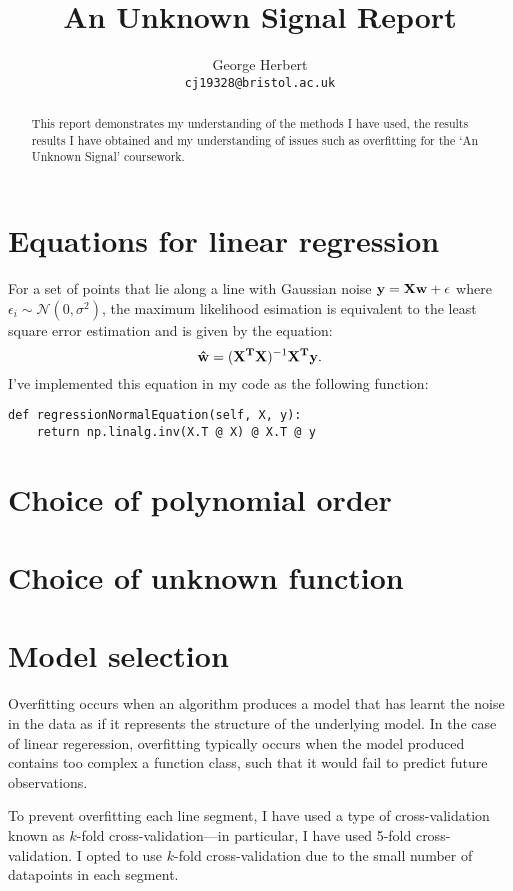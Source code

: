 \documentclass[onecolumn, 12pt, a4paper]{article}
\author{
  George Herbert\\
  \texttt{cj19328@bristol.ac.uk}
}
\title{An Unknown Signal Report}
\begin{document}
\maketitle

\begin{abstract}
    This report demonstrates my understanding of the methods I have 
    used, the results results I have obtained and my understanding
    of issues such as overfitting for the `An Unknown Signal'
    coursework.
\end{abstract}

\section{Equations for linear regression}

For a set of points that lie along a line with Gaussian noise 
$\vb{y} = \vb{X}\vb{w} + \vb{\epsilon}$ where $\epsilon_{i} \sim \mathcal{N}(0, \sigma^{2})$,
the maximum likelihood esimation is equivalent to the least square 
error estimation and is given by the equation:
\[
    \vb{\hat{w}} = (\vb{X^{T}}\vb{X})^{-1}\vb{X^{T}}\vb{y}.
\]
I've implemented this equation in my code as the following function:
\begin{verbatim}
def regressionNormalEquation(self, X, y):
    return np.linalg.inv(X.T @ X) @ X.T @ y
\end{verbatim}

\section{Choice of polynomial order}

\section{Choice of unknown function}

\section{Model selection}

Overfitting occurs when an algorithm produces a model that has
learnt the noise in the data as if it represents the
structure of the underlying model.
In the case of linear regeression, overfitting typically occurs
when the model produced contains too complex a function class,
such that it would fail to predict future observations.

To prevent overfitting each line segment, I have used a type of 
cross-validation known as $k$-fold cross-validation---in particular,
I have used 5-fold cross-validation. 
I opted to use $k$-fold cross-validation due to the small number
of datapoints in each segment.
\end{document}
